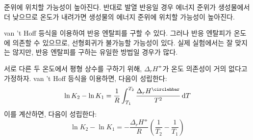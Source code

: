         준위에 위치할 가능성이 높아진다. 반대로 발열 반응일 경우 에너지 준위가 생성물에서 더 낮으므로 온도가 내려가면 생성물의 에너지 준위에 
        위치할 가능성이 높아진다.
        \par van 't Hoff 등식을 이용하여 반응 엔탈피를 구할 수 있다. 그러나 반응 엔탈피가 온도에 의존할 수 있으므로, 선형회귀가 불가능할 
        가능성이 있다. 실제 실험에서는 잘 맞지는 않지만, 반응 엔탈피를 구하는 유일한 방법일 경우가 많다.
        \par 서로 다른 두 온도에서 평형 상수를 구하기 위해, $\Delta_r H^\circlehbar$가 온도 의존성이 거의 없다고 가정하자. van 't Hoff 등식을 
        이용하면, 다음이 성립한다:
        \begin{equation*}
            \ln{K_2}-\ln{K_1} = \frac{1}{R}\int_{T_1}^{T_2}\frac{\Delta_r H^\circlehbar}{T^2}\difform T
        \end{equation*}
        이를 계산하면, 다음이 성립한다:
        \begin{equation*}
            \ln{K_2}-\ln{K_1} = -\frac{\Delta_r H^\circlehbar}{R}\left(\frac{1}{T_2}-\frac{1}{T_1}\right)
        \end{equation*}
